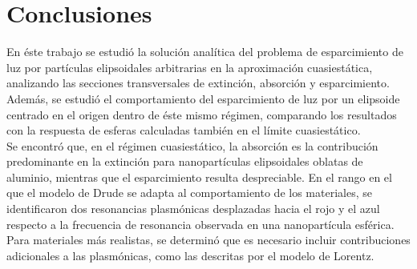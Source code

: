 \hypertarget{conclusiones}{\section{Conclusiones}}

En éste trabajo se estudió la solución analítica del problema de esparcimiento de luz por partículas elipsoidales arbitrarias en la aproximación cuasiestática, analizando las secciones transversales de extinción, absorción y esparcimiento. Además, se estudió el comportamiento del esparcimiento de luz por un elipsoide centrado en el origen dentro de éste mismo régimen, comparando los resultados con la respuesta de esferas calculadas también en el límite cuasiestático.\\

Se encontró que, en el régimen cuasiestático, la absorción es la contribución predominante en la extinción para nanopartículas elipsoidales oblatas de aluminio, mientras que el esparcimiento resulta despreciable. En el rango en el que el modelo de Drude se adapta al comportamiento de los materiales, se identificaron dos resonancias plasmónicas desplazadas hacia el rojo y el azul respecto a la frecuencia de resonancia observada en una nanopartícula esférica. Para materiales más realistas, se determinó que es necesario incluir contribuciones adicionales a las plasmónicas, como las descritas por el modelo de Lorentz.

